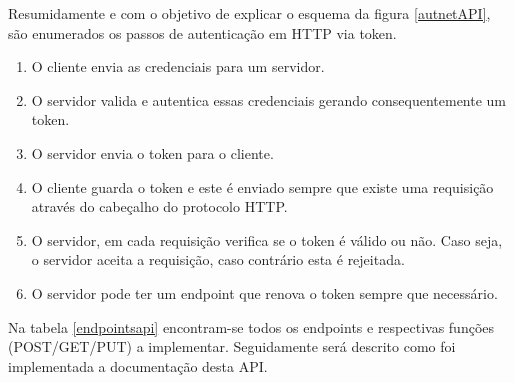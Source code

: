 Resumidamente e com o objetivo de explicar o esquema da figura \ref{autnetAPI}, são enumerados os passos de autenticação em HTTP via token. 

\begin{enumerate}
	\item O cliente envia as credenciais para um servidor.
	\item O servidor valida e autentica essas credenciais gerando consequentemente um token.
	\item O servidor envia o token para o cliente.
	\item O cliente guarda o token e este é enviado sempre que existe uma requisição através do cabeçalho do protocolo HTTP. 
	\item O servidor, em cada requisição verifica se o token é válido ou não. Caso seja, o servidor aceita a requisição, caso contrário esta é rejeitada.
	\item O servidor pode ter um endpoint que renova o token sempre que necessário. 
\end{enumerate}




Na tabela \ref{endpointsapi} encontram-se todos os endpoints e respectivas funções (POST/GET/PUT) a implementar. Seguidamente será descrito como foi implementada a documentação desta API.  


\newpage

